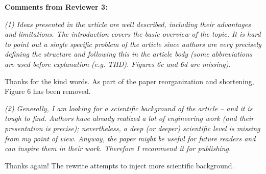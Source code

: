 \documentclass[12pt]{letter}
\begin{document}
\begin{letter}{}

{\bf Comments from Reviewer 3:}

{\em (1) Ideas presented in the article are well described, including their advantages and limitations. The introduction covers the basic overview of the topic. It is hard to point out a single specific problem of the article since authors are very precisely defining the structure and following this in the article body (some abbreviations are used before explanation (e.g. THD). Figures 6c and 6d are missing).}

Thanks for the kind words. As part of the paper reorganization and shortening, Figure 6 has been removed.


{\em (2) Generally, I am looking for a scientific background of the article – and it is tough to find. Authors have already realized a lot of engineering work (and their presentation is precise); nevertheless, a deep (or deeper) scientific level is missing from my point of view. Anyway, the paper might be useful for future readers and can inspire them in their work. Therefore I recommend it for publishing.}

Thanks again!  The rewrite attempts to inject more scientific background.

\end{letter}
\end{document}
